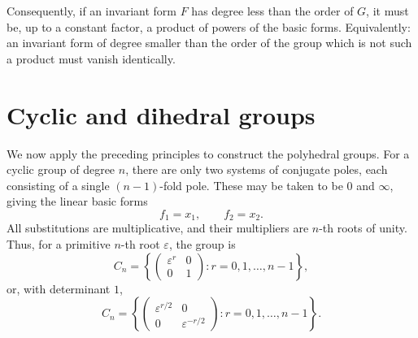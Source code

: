 \documentclass[11pt]{article}
\begin{document}
Consequently, if an invariant form $F$ has degree less than the order of $G$, it must be, up to a constant factor, a product of powers of the basic forms.  Equivalently: an invariant form of degree smaller than the order of the group which is not such a product must vanish identically.

\section{Cyclic and dihedral groups}

We now apply the preceding principles to construct the polyhedral groups.  For a cyclic group of degree $n$, there are only two systems of conjugate poles, each consisting of a single $(n-1)$-fold pole.  These may be taken to be $0$ and $\infty$, giving the linear basic forms
\begin{equation}\label{eq:w9-cyc-basic}
 f_1=x_1,
 \qquad f_2=x_2.
\end{equation}
All substitutions are multiplicative, and their multipliers are $n$-th roots of unity.  Thus, for a primitive $n$-th root $\varepsilon$, the group is
\begin{equation}\label{eq:w9-Cn}
 C_n=\left\{
 \begin{pmatrix}\varepsilon^r&0\\0&1\end{pmatrix}
 :r=0,1,\ldots,n-1
 \right\},
\end{equation}
or, with determinant $1$,
\begin{equation}\label{eq:w9-Cn-det1}
 C_n=\left\{
 \begin{pmatrix}\varepsilon^{r/2}&0\\0&\varepsilon^{-r/2}\end{pmatrix}
 :r=0,1,\ldots,n-1
 \right\}.
\end{equation}
\end{document}
